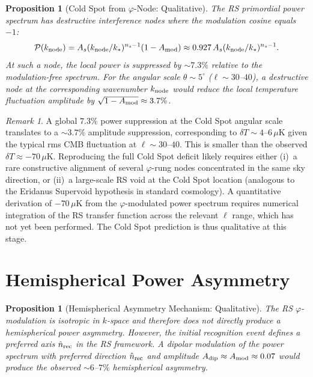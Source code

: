 \documentclass[12pt,a4paper]{article}
\newtheorem{proposition}[theorem]{Proposition}
\theoremstyle{definition}
\theoremstyle{remark}
\newtheorem{remark}[theorem]{Remark}
\begin{document}
\begin{proposition}[Cold Spot from $\varphi$-Node: Qualitative]
\label{prop:cold}
The RS primordial power spectrum has destructive interference nodes
where the modulation cosine equals $-1$:
\[
  \mathcal{P}(k_{\rm node}) = A_s(k_{\rm node}/k_*)^{n_s - 1}
  (1 - A_{\mathrm{mod}}) \approx 0.927\,A_s(k_{\rm node}/k_*)^{n_s-1}.
\]
At such a node, the local power is suppressed by $\sim 7.3\%$ relative
to the modulation-free spectrum.  For the angular scale
$\theta \sim 5^\circ$ ($\ell \sim 30$--$40$), a destructive node at
the corresponding wavenumber $k_{\rm node}$ would reduce the local
temperature fluctuation amplitude by $\sqrt{1 - A_{\rm mod}} \approx 3.7\%$.
\end{proposition}

\begin{remark}
A global $7.3\%$ power suppression at the Cold Spot angular scale
translates to a $\sim 3.7\%$ amplitude suppression, corresponding to
$\delta T \sim 4$--$6\,\mu$K given the typical rms CMB fluctuation at
$\ell \sim 30$--$40$.  This is smaller than the observed $\delta T
\approx -70\,\mu$K.  Reproducing the full Cold Spot deficit likely
requires either (i)~a rare constructive alignment of several
$\varphi$-rung nodes concentrated in the same sky direction, or
(ii)~a large-scale RS void at the Cold Spot location (analogous to
the Eridanus Supervoid hypothesis in standard cosmology).  A
quantitative derivation of $-70\,\mu$K from the $\varphi$-modulated
power spectrum requires numerical integration of the RS transfer
function across the relevant $\ell$ range, which has not yet been
performed.  The Cold Spot prediction is thus qualitative at this stage.
\end{remark}

\section{Hemispherical Power Asymmetry}
\label{sec:hemi}

\begin{proposition}[Hemispherical Asymmetry Mechanism: Qualitative]
\label{prop:hemi}
The RS $\varphi$-modulation is isotropic in $k$-space and therefore
does not directly produce a hemispherical power asymmetry.  However,
the initial recognition event defines a preferred axis
$\hat{n}_{\rm rec}$ in the RS framework.  A dipolar modulation of the
power spectrum with preferred direction $\hat{n}_{\rm rec}$ and
amplitude $A_{\rm dip} \approx A_{\rm mod} \approx 0.07$ would produce
the observed $\sim 6$--$7\%$ hemispherical asymmetry.
\end{proposition}
\end{document}
